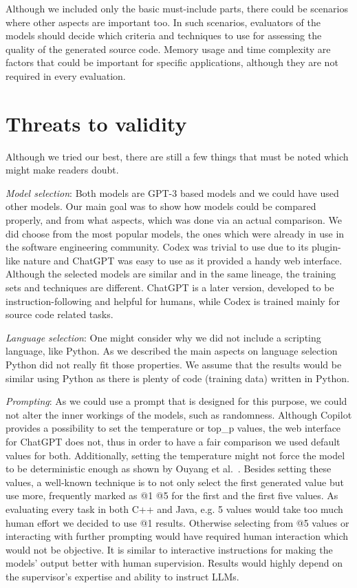 Although we included only the basic must-include parts, there could be scenarios where other aspects are important too.
In such scenarios, evaluators of the models should decide which criteria and techniques to use for assessing the quality of the generated source code.
Memory usage and time complexity are factors that could be important for specific applications, although they are not required in every evaluation.



\section{Threats to validity}
\label{l:threats_to_validity}
Although we tried our best, there are still a few things that must be noted which might make readers doubt.

\textit{Model selection}: Both models are GPT-3 based models and we could have used other models.
Our main goal was to show how models could be compared properly, and from what aspects, which was done via an actual comparison.
We did choose from the most popular models, the ones which were already in use in the software engineering community.
Codex was trivial to use due to its plugin-like nature and ChatGPT was easy to use as it provided a handy web interface.
Although the selected models are similar and in the same lineage, the training sets and techniques are different.
ChatGPT is a later version, developed to be instruction-following and helpful for humans, while Codex is trained mainly for source code related tasks.

\textit{Language selection}: One might consider why we did not include a scripting language, like Python.
As we described the main aspects on language selection Python did not really fit those properties.
We assume that the results would be similar using Python as there is plenty of code (training data) written in Python.

\textit{Prompting}: As we could use a prompt that is designed for this purpose, we could not alter the inner workings of the models, such as randomness.
Although Copilot provides a possibility to set the temperature or top\_p values, the web interface for ChatGPT does not, thus in order to have a fair comparison we used default values for both.
Additionally, setting the temperature might not force the model to be deterministic enough as shown by Ouyang et al.~\cite{temperature_not_enough}.
Besides setting these values, a well-known technique is to not only select the first generated value but use more, frequently marked as @1 @5 for the first and the first five values.
As evaluating every task in both C++ and Java, e.g. 5 values would take too much human effort we decided to use @1 results.
Otherwise selecting from @5 values or interacting with further prompting would have required human interaction which would not be objective.
It is similar to interactive instructions for making the models' output better with human supervision.
Results would highly depend on the supervisor's expertise and ability to instruct LLMs.


